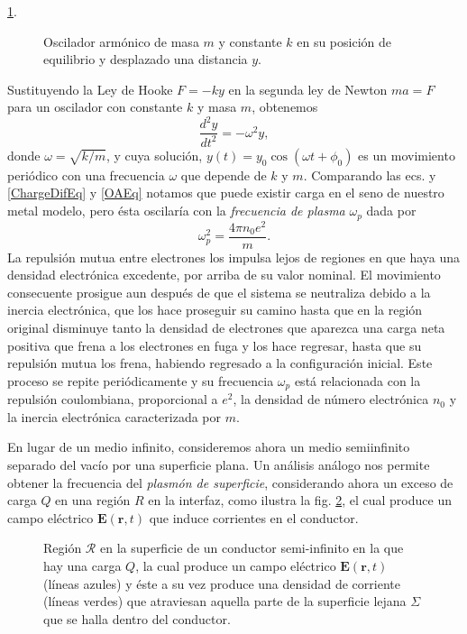 \documentclass[12pt]{article}
\begin{document}
\ref{OscArmonicoSimple}.
\begin{figure}
  \centering
  
  \caption{\label{OscArmonicoSimple} Oscilador armónico de masa $m$ y
    constante $k$ en su posición de equilibrio y desplazado una
    distancia $y$.}
\end{figure}
Sustituyendo la Ley de Hooke $F= -ky$ en la segunda ley de Newton
$ma=F$ para un oscilador con constante $k$ y masa $m$, obtenemos \cite{plasmons}
\begin{equation}
  \label{OAEq}
  \frac{d^{2}y}{dt^{2}}=-\omega^2y,
\end{equation}
donde $\omega=\sqrt{k/m}$, y cuya solución,
$y(t)=y_{0}\cos(\omega t+\phi_0)$ es un movimiento periódico con una
frecuencia $\omega$ que depende de $k$ y $m$.  Comparando las ecs.  y
\eqref{ChargeDifEq} y \eqref{OAEq} notamos que puede existir carga en
el seno de nuestro metal modelo, pero ésta oscilaría con la {\em
  frecuencia de plasma} $\omega_p$ dada por
\begin{equation}
  \label{plasmafec}
  \omega _{p}^{2} = \frac{4\pi n_0e^{2}}{m}.
\end{equation}
La repulsión mutua entre electrones los impulsa lejos de regiones en
que haya una densidad electrónica excedente, por arriba de su valor
nominal. El movimiento consecuente prosigue aun después de que el
sistema se neutraliza debido a la inercia electrónica, que los hace
proseguir su camino hasta que en la región original disminuye tanto la
densidad de electrones que aparezca una carga neta positiva que frena
a los electrones en fuga y los hace regresar, hasta que su repulsión
mutua los frena, habiendo regresado a la configuración inicial. Este
proceso se repite periódicamente y su frecuencia $\omega_p$ está
relacionada con la repulsión coulombiana, proporcional a $e^2$, la
densidad de número electrónica $n_0$ y la inercia electrónica
caracterizada por $m$.

En lugar de un medio infinito, consideremos ahora un medio
semiinfinito separado del vacío por una superficie plana.  Un análisis
análogo nos permite obtener la frecuencia del {\em plasmón de
  superficie}, considerando ahora un exceso de carga $Q$ en una región
$R$ en la interfaz, como ilustra la fig.  \ref{Surfplasmon}, el cual
produce un campo eléctrico $\bm{E}(\bm{r},t)$ que induce corrientes en
el conductor.
\begin{figure}
  \centering
  
  \caption{Región $\mathcal{R}$ en la superficie de un conductor
    semi-infinito en la que hay una carga $Q$, la cual produce un
    campo eléctrico $\bm{E}(\bm{r},t)$ (líneas azules) y éste a su vez
    produce una densidad de corriente (líneas verdes) que atraviesan
    aquella parte de la superficie lejana $\Sigma$ que se halla dentro
    del conductor.}
\label{Surfplasmon}
\end{figure}
\end{document}
